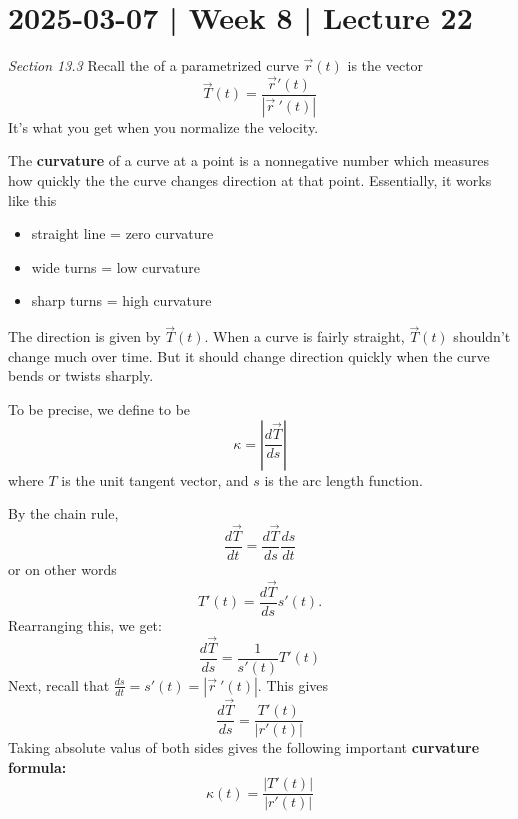 \documentclass[10pt]{article}
\theoremstyle{definition}
\newcommand{\1}[1]{\textbf{1}_{\left[#1\right]}} %
\newcommand{\dempfcolor}[1]{{\color{RoyalBlue}#1}}
\newcommand{\demph}[1]{\dempfcolor{{\sl #1}}}
\begin{document}
\newpage
\section{2025-03-07 | Week 8 | Lecture 22}
\textit{Section 13.3}
Recall the \demph{unit tangent vector} of a parametrized curve $\vec{r}(t)$ is the vector
\begin{equation*}
  \vec{T}(t) = \frac{\vec{r}'(t)}{|\vec{r}\ '(t)|}
\end{equation*}
It's what you get when you normalize the velocity. 

The \textbf{curvature} of a curve at a point is a nonnegative number which measures how quickly the the curve
changes direction at that point. Essentially, it works like this
\begin{itemize}
  \item straight line = zero curvature
  \item wide turns = low curvature
  \item sharp turns = high curvature
\end{itemize}
The direction is given by $\vec{T}(t)$. When a curve is fairly straight, $\vec{T}(t)$ shouldn't change
much over time. But it should change direction quickly when the curve bends or twists sharply.

To be precise, we define \demph{curvature} to be
\begin{equation*}
  \kappa = \left| \frac{d\vec{T}}{ds} \right|
\end{equation*}
where $T$ is the unit tangent vector, and $s$ is the arc length function.

By the chain rule,
\begin{equation*}
  \frac{d\vec{T}}{dt} = \frac{d\vec{T}}{ds} \frac{ds}{dt}
\end{equation*}
or on other words
\begin{equation*}
  T'(t) = \frac{d\vec{T}}{ds}s'(t).
\end{equation*}
Rearranging this, we get:
\begin{equation*}
  \frac{d\vec{T}}{ds} = \frac{1}{s'(t)} T'(t)
\end{equation*}
Next, recall that $\frac{ds}{dt} = s'(t) = |\vec{r}\ '(t)|$. This gives
\begin{equation*}
  \frac{d\vec{T}}{ds} = \frac{T'(t)}{|r'(t)|}
\end{equation*}
Taking absolute valus of both sides gives the following important \textbf{curvature formula:}
\begin{equation}\label{eq:curvature-formula}
  \boxed{\kappa(t) = \frac{|T'(t)|}{|r'(t)|}}
\end{equation}
\end{document}
